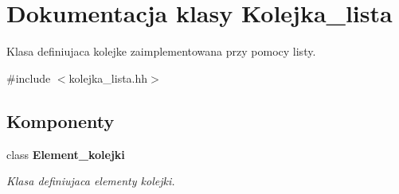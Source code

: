 \hypertarget{class_kolejka__lista}{\section{\-Dokumentacja klasy \-Kolejka\-\_\-lista}
\label{class_kolejka__lista}
}


\-Klasa definiujaca kolejke zaimplementowana przy pomocy listy.  




{\ttfamily \#include $<$kolejka\-\_\-lista.\-hh$>$}

\subsection*{\-Komponenty}
\begin{DoxyCompactItemize}
\item 
class {\bfseries \-Element\-\_\-kolejki}
\begin{DoxyCompactList}\small\item\em \-Klasa definiujaca elementy kolejki. \end{DoxyCompactList}\end{DoxyCompactItemize}
